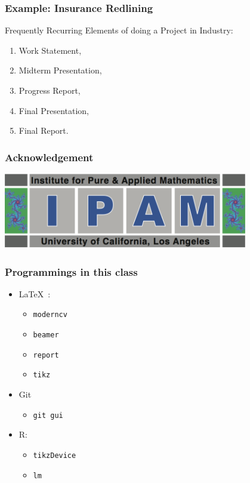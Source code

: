 \documentclass[hyperref={colorlinks=false},compress,handout,10pt]{beamer}
\let\olditem\item
\renewcommand{\item}{\setlength{\itemsep}{0.5\baselineskip}\olditem}
\def\LaTeXs{\LaTeX\ }
\begin{document}
\begin{frame}
    \frametitle{Example: Insurance Redlining}
    Frequently Recurring Elements of doing a Project in Industry:
    \vspace{7pt}
             \begin{enumerate}
                 \item Work Statement,
                 \item Midterm Presentation,
                 \item Progress Report,
                 \item Final Presentation,
                 \item Final Report.
             \end{enumerate}
\end{frame}

\begin{frame}
    \frametitle{Acknowledgement}
    \begin{center}
        \href{http://www.ipam.ucla.edu/programs/rips2011/}{
        \includegraphics[width=0.8\textwidth]{images/ipam}}        
    \end{center}
\end{frame}
            
\begin{frame}
    \frametitle{Programmings in this class}
    \begin{itemize}
        \item \LaTeXs: 
            \begin{itemize}
                \item \texttt{moderncv}
                \item \texttt{beamer}
                \item \texttt{report}
                \item \texttt{tikz}
            \end{itemize}
        \item Git
            \begin{itemize}
                \item \texttt{git gui}
            \end{itemize}
        \item R:
            \begin{itemize}
                \item \texttt{tikzDevice}
                \item \texttt{lm}
            \end{itemize}
    \end{itemize}
\end{frame}
\end{document}
